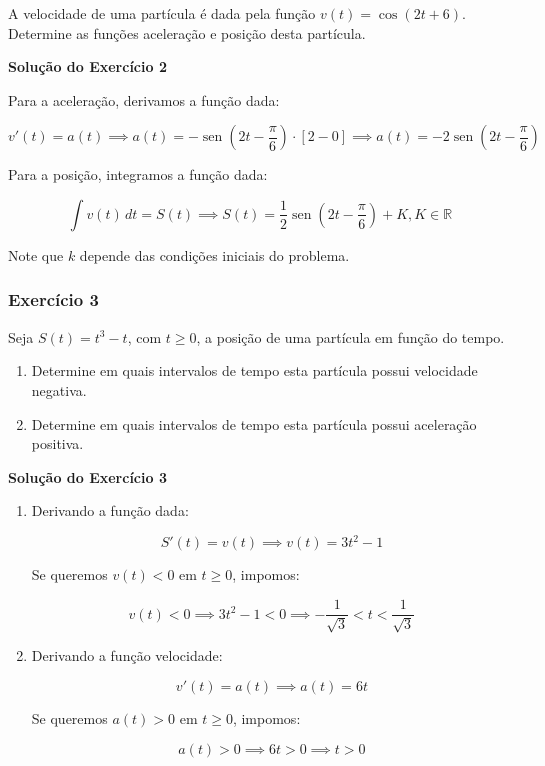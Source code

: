 \documentclass[12pt,openright,twoside,a4paper]{article}
\theoremstyle{definition}
\renewcommand{\sin}{\operatorname{sen}} %
\begin{document}
		A velocidade de uma partícula é dada pela função \( v(t) = \cos(2t + 6) \). Determine as funções aceleração e posição desta partícula.
		
		\textbf{Solução do Exercício 2}
		
		Para a aceleração, derivamos a função dada:
		
		
		\[
		v'(t) = a(t) \implies a(t) =- \sin{\left(2t - \dfrac{\pi}{6}\right)} \cdot [2-0] \implies a(t) = -2 \sin{\left(2t - \dfrac{\pi}{6}\right)}
		\]
		
		
		
		Para a posição, integramos a função dada:
		
		
		\[
		\int v(t) \,dt = S(t) \implies S(t) = \dfrac{1}{2} \sin{\left(2t - \dfrac{\pi}{6}\right)} + K, K \in \mathbb{R}
		\]
		
		
		
		Note que \( k \) depende das condições iniciais do problema.
		
		\subsubsection{Exercício 3}
		
		Seja \( S(t) = t^3 - t \), com \( t \geq 0 \), a posição de uma partícula em função do tempo.
		
		\begin{enumerate}
			\item[(a)] Determine em quais intervalos de tempo esta partícula possui velocidade negativa.
			
			\item[(b)] Determine em quais intervalos de tempo esta partícula possui aceleração positiva.
		\end{enumerate}
		
		\textbf{Solução do Exercício 3}
		
		\begin{enumerate}
			\item[(a)] Derivando a função dada:
			
			
			\[
			S'(t) = v(t) \implies v(t) = 3t^2 - 1 
			\]
			
			
			Se queremos \( v(t) < 0 \) em \(t \geq 0\), impomos:
			
			
			\[
			v(t) < 0  \implies 3t^2 - 1  <0  \implies - \dfrac{1}{\sqrt{3}} < t < \dfrac{1}{\sqrt{3}}
			\]
			
			
			
			\item[(b)] Derivando a função velocidade:
			
			
			\[
			v'(t) = a(t) \implies a(t) = 6t 
			\]
			
			
			Se queremos \( a(t) > 0 \) em \(t \geq 0\), impomos:
			
			
			\[
			a(t) > 0 \implies 6t > 0 \implies t>0
			\]
			
			
		\end{enumerate}
	
\end{document}
